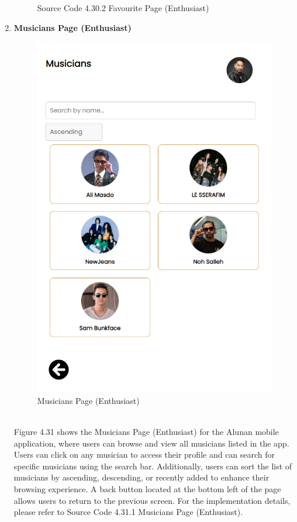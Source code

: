 \begin{enumerate}[1.]
\begin{figure}[h]
\begin{subfigure}[b]{0.9\textwidth}
            \label{fig:sub3}
        \end{subfigure}
        \caption*{Source Code 4.30.2 Favourite Page (Enthusiast)}
        \label{fig:myfig69b}
    \end{figure}
    \clearpage

    \item \textbf{Musicians Page (Enthusiast)}
    \begin{figure}[h]
        \centering
        \includegraphics[width=0.5\linewidth]{mainmatter/images/frontend/ss/Musicians (Enthusiast).png}
        \caption{Musicians Page (Enthusiast)}
        \label{fig:myfig70}
    \end{figure} \\
    Figure 4.31 shows the Musicians Page (Enthusiast) for the Alunan mobile application, where users can browse and view all musicians listed in the app. Users can click on any musician to access their profile and can search for specific musicians using the search bar. Additionally, users can sort the list of musicians by ascending, descending, or recently added to enhance their browsing experience. A back button located at the bottom left of the page allows users to return to the previous screen. For the implementation details, please refer to Source Code 4.31.1 Musicians Page (Enthusiast).
    \clearpage
    \begin{figure}[h]\ContinuedFloat
        \centering
        \begin{subfigure}[b]{0.7\textwidth}
            \centering

\end{subfigure}
\end{figure}
\end{enumerate}
